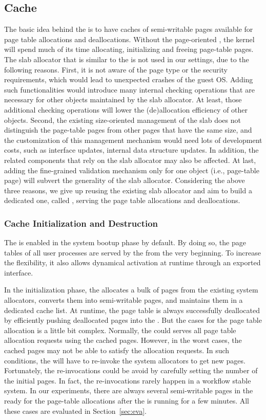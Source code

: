 \subsection{\name Cache}\label{sec:cache}
The basic idea behind the \cache is to have caches of semi-writable pages available for page table allocations and deallocations.
Without the page-oriented \cache, the kernel will spend much of its time allocating, initializing and freeing page-table pages.
The slab allocator that is similar to the \cache is not used in our settings, due to the following reasons.
First, it is not aware of the page type or the security requirements, which would lead to unexpected crashes of the guest OS.
Adding such functionalities would introduce many internal checking operations that are necessary for other objects maintained by the slab allocator.
At least, those additional checking operations will lower the (de)allocation efficiency of other objects.
Second, the existing size-oriented management of the slab does not distinguish the page-table pages from other pages that have the same size, and the customization of this management mechanism would need lots of development costs, such as interface updates, internal data structure updates.
In addition, the related components that rely on the slab allocator may also be affected.
At last, adding the fine-grained validation mechanism only for one object (i.e., page-table page) will subvert the generality of the slab allocator.
Considering the above three reasons, we give up reusing the existing slab allocator and aim to build a dedicated one, called \cache, serving the page table allocations and deallocations.

\subsubsection{\name Cache Initialization and Destruction}
The \cache is enabled in the system bootup phase by default.
By doing so, the page tables of all user processes are served by the \cache from the very beginning.
To increase the flexibility, it also allows dynamical activation at runtime through an exported interface.

In the initialization phase, the \cache allocates a bulk of pages from the existing system allocators, converts them into semi-writable pages, and maintains them in a dedicated cache list.
At runtime, the page table is always successfully deallocated by efficiently pushing deallocated pages into the \cache.
But the cases for the page table allocation is a little bit complex.
Normally, the \cache could serves all page table allocation requests using the cached pages.
However, in the worst cases, the cached pages may not be able to satisfy the allocation requests.
In such conditions, the \cache will have to re-invoke the system allocators to get new pages.
Fortunately, the re-invocations could be avoid by carefully setting the number of the initial pages.
In fact, the re-invocations rarely happen in a workflow stable system.
In our experiments, there are always several  semi-writable pages in the \cache ready for the page-table allocations after the \name is running for a few minutes.
All these cases are evaluated in Section~\ref{sec:eva}.

